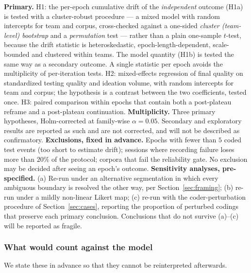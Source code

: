 \documentclass[11pt]{article}
\begin{document}
\textbf{Primary.} H1: the per-epoch cumulative drift of the \emph{independent} outcome (H1a) is tested with a cluster-robust procedure --- a mixed model with random intercepts for team and corpus, cross-checked against a one-sided \emph{cluster (team-level) bootstrap} and a \emph{permutation} test --- rather than a plain one-sample $t$-test, because the drift statistic is heteroskedastic, epoch-length-dependent, scale-bounded and clustered within teams. The model quantity (H1b) is tested the same way as a secondary outcome. A single statistic per epoch avoids the multiplicity of per-iteration tests. H2: mixed-effects regression of final quality on standardized testing quality and ideation volume, with random intercepts for team and corpus; the hypothesis is a contrast between the two coefficients, tested once. H3: paired comparison within epochs that contain both a post-plateau reframe and a post-plateau continuation. \textbf{Multiplicity.} Three primary hypotheses, Holm-corrected at family-wise $\alpha=0.05$. Secondary and exploratory results are reported as such and are not corrected, and will not be described as confirmatory. \textbf{Exclusions, fixed in advance.} Epochs with fewer than $5$ coded test events (too short to estimate drift); sessions where recording failure loses more than $20\%$ of the protocol; corpora that fail the reliability gate. No exclusion may be decided after seeing an epoch's outcome. \textbf{Sensitivity analyses, pre-specified.} (a) Re-run under an alternative segmentation in which every ambiguous boundary is resolved the other way, per Section~\ref{sec:framing}; (b) re-run under a mildly non-linear Likert map; (c) re-run with the coder-perturbation procedure of Section~\ref{sec:cases}, reporting the proportion of perturbed codings that preserve each primary conclusion. Conclusions that do not survive (a)--(c) will be reported as fragile.

\subsubsection*{What would count against the model}

We state these in advance so that they cannot be reinterpreted afterwards.
\end{document}

